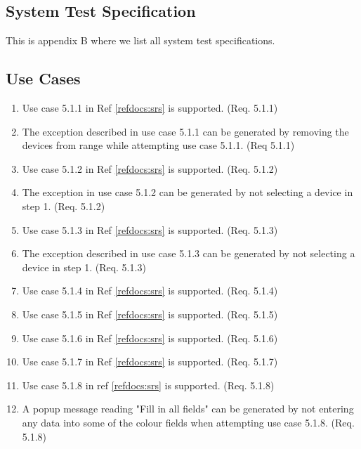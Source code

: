 \documentclass[a4paper]{article}
\newlength{\testlabellength}
\newenvironment{testlist}{\begin{enumerate}[label=\bfseries Test \thesubsection.\arabic* , labelindent=0pt, labelwidth=\testlabellength , leftmargin=2cm]}{\end{enumerate}}
\begin{document}
\begin{appendices}
\section{System Test Specification} \label{appendix:section:systemtest}
This is appendix B where we list all system test specifications.

\subsection{Use Cases}
\begin{testlist}
	\item Use case 5.1.1 in Ref \ref{refdocs:srs} is supported. (Req. 5.1.1)
	\item The exception described in use case 5.1.1 can be generated by removing the devices from range while attempting use case 5.1.1. (Req 5.1.1)
	
	\item Use case 5.1.2 in Ref \ref{refdocs:srs} is supported. (Req. 5.1.2)
	
	\item The exception in use case 5.1.2 can be generated by not selecting a device in step 1. (Req. 5.1.2)
	
	\item Use case 5.1.3 in Ref \ref{refdocs:srs} is supported. (Req. 5.1.3)
	
	\item The exception described in use case 5.1.3 can be generated by not selecting a device in step 1. (Req. 5.1.3)
	
	\item Use case 5.1.4 in Ref \ref{refdocs:srs} is supported. (Req. 5.1.4)
	
	\item Use case 5.1.5 in Ref \ref{refdocs:srs} is supported. (Req. 5.1.5)
	
	\item Use case 5.1.6 in Ref \ref{refdocs:srs} is supported. (Req. 5.1.6)
	
	\item Use case 5.1.7 in Ref \ref{refdocs:srs} is supported. (Req. 5.1.7)
	
	\item Use case 5.1.8 in ref \ref{refdocs:srs} is supported. (Req. 5.1.8)
	
	\item A popup message reading "Fill in all fields" can be generated by not entering any data into some of the colour fields when attempting use case 5.1.8. (Req. 5.1.8)
	

\end{testlist}
\end{appendices}
\end{document}
